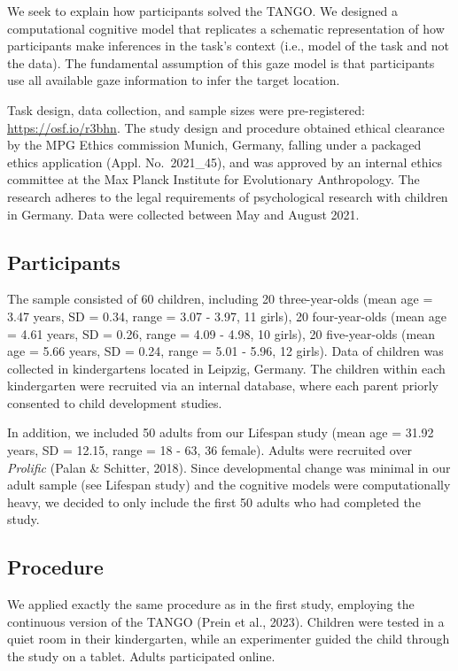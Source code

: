 \documentclass[
  man,mask,floatsintext]{apa6}
\begin{document}
We seek to explain how participants solved the TANGO. We designed a computational cognitive model that replicates a schematic representation of how participants make inferences in the task's context (i.e., model of the task and not the data). The fundamental assumption of this gaze model is that participants use all available gaze information to infer the target location.

Task design, data collection, and sample sizes were pre-registered: \url{https://osf.io/r3bhn}. The study design and procedure obtained ethical clearance by the MPG Ethics commission Munich, Germany, falling under a packaged ethics application (Appl. No.~2021\_45), and was approved by an internal ethics committee at the Max Planck Institute for Evolutionary Anthropology. The research adheres to the legal requirements of psychological research with children in Germany. Data were collected between May and August 2021.

\hypertarget{participants-1}{%
\subsection{Participants}\label{participants-1}}

The sample consisted of 60 children, including 20 three-year-olds (mean age = 3.47 years, SD = 0.34, range = 3.07 - 3.97, 11 girls), 20 four-year-olds (mean age = 4.61 years, SD = 0.26, range = 4.09 - 4.98, 10 girls), 20 five-year-olds (mean age = 5.66 years, SD = 0.24, range = 5.01 - 5.96, 12 girls). Data of children was collected in kindergartens located in Leipzig, Germany. The children within each kindergarten were recruited via an internal database, where each parent priorly consented to child development studies.

In addition, we included 50 adults from our Lifespan study (mean age = 31.92 years, SD = 12.15, range = 18 - 63, 36 female). Adults were recruited over \emph{Prolific} (Palan \& Schitter, 2018). Since developmental change was minimal in our adult sample (see Lifespan study) and the cognitive models were computationally heavy, we decided to only include the first 50 adults who had completed the study.

\hypertarget{procedure-1}{%
\subsection{Procedure}\label{procedure-1}}

We applied exactly the same procedure as in the first study, employing the continuous version of the TANGO (Prein et al., 2023). Children were tested in a quiet room in their kindergarten, while an experimenter guided the child through the study on a tablet. Adults participated online.
\end{document}
